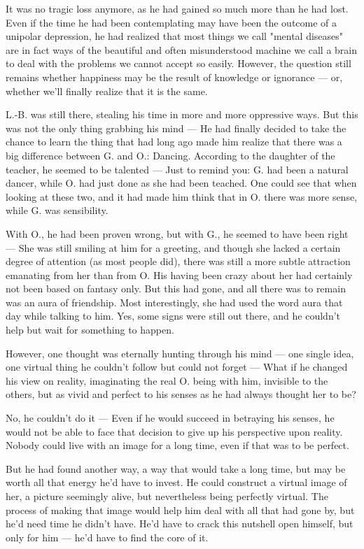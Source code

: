 It was no tragic loss anymore, as he had gained so much more than he had lost. Even if the time he had been contemplating may have been the outcome of a unipolar depression, he had realized that most things we call "mental diseases" are in fact ways of the beautiful and often misunderstood machine we call a brain to deal with the problems we cannot accept so easily. However, the question still remains whether happiness may be the result of knowledge or ignorance --- or, whether we'll finally realize that it is the same.

L.-B. was still there, stealing his time in more and more oppressive ways. But this was not the only thing grabbing his mind --- He had finally decided to take the chance to learn the thing that had long ago made him realize that there was a big difference between G. and O.: Dancing. According to the daughter of the teacher, he seemed to be talented --- Just to remind you: G. had been a natural dancer, while O. had just done as she had been teached. One could see that when looking at these two, and it had made him think that in O. there was more sense, while G. was sensibility.

With O., he had been proven wrong, but with G., he seemed to have been right --- She was still smiling at him for a greeting, and though she lacked a certain degree of attention (as most people did), there was still a more subtle attraction emanating from her than from O. His having been crazy about her had certainly not been based on fantasy only. But this had gone, and all there was to remain was an aura of friendship. Most interestingly, she had used the word aura that day while talking to him.
Yes, some signs were still out there, and he couldn't help but wait for something to happen.

However, one thought was eternally hunting through his mind --- one single idea, one virtual thing he couldn't follow but could not forget --- What if he changed his view on reality, imaginating the real O. being with him, invisible to the others, but as vivid and perfect to his senses as he had always thought her to be?

No, he couldn't do it --- Even if he would succeed in betraying his senses, he would not be able to face that decision to give up his perspective upon reality. Nobody could live with an image for a long time, even if that was to be perfect.

But he had found another way, a way that would take a long time, but may be worth all that energy he'd have to invest. He could construct a virtual image of her, a picture seemingly alive, but nevertheless being perfectly virtual. The process of making that image would help him deal with all that had gone by, but he'd need time he didn't have. 
He'd have to crack this nutshell open himself, but only for him --- he'd have to find the core of it.

